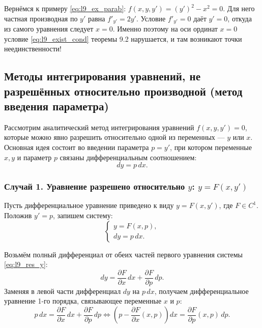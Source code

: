 \begin{remark}
    Вернёмся к примеру \eqref{eq:l9_ex_parab}: $f(x, y, y') = (y')^2 - x^2 = 0$.
    Для него частная производная по $y'$ равна $f'_{y'} = 2 y'$. Условие
    $f'_{y'} = 0$ даёт $y' = 0$, откуда из самого уравнения следует $x = 0$.
    Именно поэтому на оси ординат $x = 0$ условие \eqref{eq:l9_exist_cond}
    теоремы 9.2 нарушается, и там возникают точки неединственности!
\end{remark}

\subsection{Методы интегрирования уравнений, не разрешённых относительно производной (метод введения параметра)}

Рассмотрим аналитический метод интегрирования уравнений $f(x, y, y') = 0$,
которые можно явно разрешить относительно одной из переменных — $y$ или $x$.
Основная идея состоит во введении параметра $p = y'$, при котором переменные
$x, y$ и параметр $p$ связаны дифференциальным соотношением:
\[
    dy = p \, dx.
\]

\subsubsection{Случай 1. Уравнение разрешено относительно $y$: $y = F(x, y')$}

Пусть дифференциальное уравнение приведено к виду $y = F(x, y')$, где
$F \in C^1$. Положив $y' = p$, запишем систему:
\begin{equation} \label{eq:l9_res_y}
    \begin{cases}
        y = F(x, p), \\
        dy = p \, dx.
    \end{cases} \tag{7}
\end{equation}

Возьмём полный дифференциал от обеих частей первого уравнения системы
\eqref{eq:l9_res_y}:
\[
    dy = \frac{\partial F}{\partial x} \, dx +
    \frac{\partial F}{\partial p} \, dp.
\]
Заменяя в левой части дифференциал $dy$ на $p \, dx$, получаем дифференциальное
уравнение 1-го порядка, связывающее переменные $x$ и $p$:
\begin{equation} \label{eq:l9_res_y_diff}
    p \, dx = \frac{\partial F}{\partial x} \, dx +
    \frac{\partial F}{\partial p} \, dp \iff
    \left(p - \frac{\partial F}{\partial x}(x, p)\right) dx =
    \frac{\partial F}{\partial p}(x, p) \, dp. \tag{8}
\end{equation}

